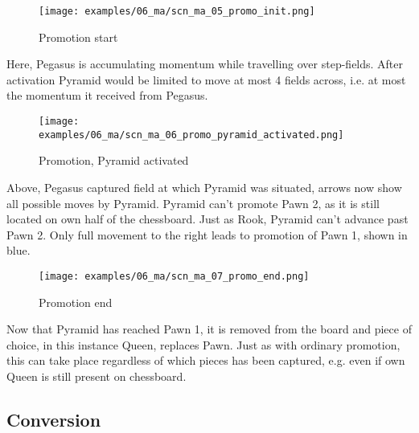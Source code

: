 \clearpage %

\noindent
\begin{figure}[!h]
\texttt{[image: examples/06\_ma/scn\_ma\_05\_promo\_init.png]}
\caption{Promotion start}
\label{fig:scn_ma_05_promo_init}
\end{figure}

Here, Pegasus is accumulating momentum while travelling over step-fields. After
activation Pyramid would be limited to move at most 4 fields across, i.e. at most
the momentum it received from Pegasus.

\clearpage %

\noindent
\begin{figure}[!h]
\texttt{[image: examples/06\_ma/scn\_ma\_06\_promo\_pyramid\_activated.png]}
\caption{Promotion, Pyramid activated}
\label{fig:scn_ma_06_promo_pyramid_activated}
\end{figure}

Above, Pegasus captured field at which Pyramid was situated, arrows now show
all possible moves by Pyramid. Pyramid can't promote Pawn 2, as it is still
located on own half of the chessboard. Just as Rook, Pyramid can't advance
past Pawn 2. Only full movement to the right leads to promotion of Pawn 1,
shown in blue.

\clearpage %

\noindent
\begin{figure}[!h]
\texttt{[image: examples/06\_ma/scn\_ma\_07\_promo\_end.png]}
\caption{Promotion end}
\label{fig:scn_ma_07_promo_end}
\end{figure}

Now that Pyramid has reached Pawn 1, it is removed from the board and piece of
choice, in this instance Queen, replaces Pawn. Just as with ordinary promotion,
this can take place regardless of which pieces has been captured, e.g. even if
own Queen is still present on chessboard.

\clearpage %

\subsection*{Conversion}
\label{sec:Mayan Ascendancy/Pyramid/Conversion}

